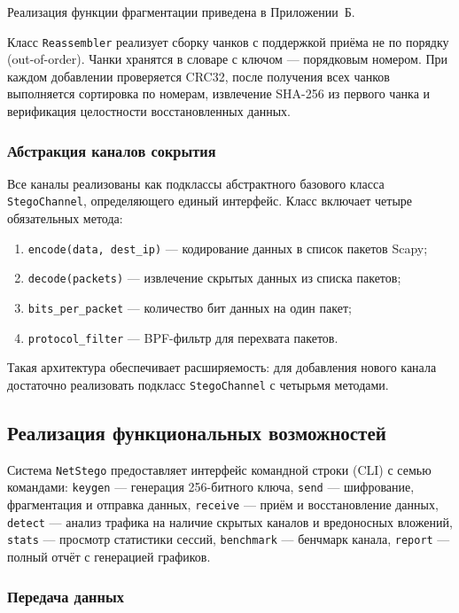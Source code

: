 Реализация функции фрагментации приведена в Приложении~Б.

Класс \texttt{Reassembler} реализует сборку чанков с поддержкой приёма не по порядку (out-of-order). Чанки хранятся в словаре с ключом --- порядковым номером. При каждом добавлении проверяется CRC32, после получения всех чанков выполняется сортировка по номерам, извлечение SHA-256 из первого чанка и верификация целостности восстановленных данных.

\subsubsection{Абстракция каналов сокрытия}

Все каналы реализованы как подклассы абстрактного базового класса \texttt{StegoChannel}, определяющего единый интерфейс. Класс включает четыре обязательных метода:

\begin{enumerate}[label=\arabic*)]
    \item \texttt{encode(data, dest\_ip)} --- кодирование данных в список пакетов Scapy;
    \item \texttt{decode(packets)} --- извлечение скрытых данных из списка пакетов;
    \item \texttt{bits\_per\_packet} --- количество бит данных на один пакет;
    \item \texttt{protocol\_filter} --- BPF-фильтр для перехвата пакетов.
\end{enumerate}

Такая архитектура обеспечивает расширяемость: для добавления нового канала достаточно реализовать подкласс \texttt{StegoChannel} с четырьмя методами.

\subsection{Реализация функциональных возможностей}

Система \texttt{NetStego} предоставляет интерфейс командной строки (CLI) с семью командами: \texttt{keygen} --- генерация 256-битного ключа, \texttt{send} --- шифрование, фрагментация и отправка данных, \texttt{receive} --- приём и восстановление данных, \texttt{detect} --- анализ трафика на наличие скрытых каналов и вредоносных вложений, \texttt{stats} --- просмотр статистики сессий, \texttt{benchmark} --- бенчмарк канала, \texttt{report} --- полный отчёт с генерацией графиков.

\subsubsection{Передача данных}

